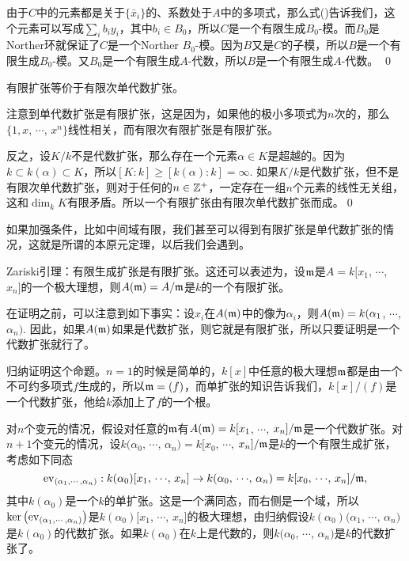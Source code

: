 	由于$C$中的元素都是关于$\{\bar{x}_i\}$的、系数处于$A$中的多项式，那么式(\theequation)告诉我们，这个元素可以写成$\sum_i b_i y_i$，其中$b_i\in B_0$，所以$C$是一个有限生成$B_0$-模。而$B_0$是Norther环就保证了$C$是一个Norther $B_0$-模。因为$B$又是$C$的子模，所以$B$是一个有限生成$B_0$-模。又$B_0$是一个有限生成$A$-代数，所以$B$是一个有限生成$A$-代数。
\qed

\pro 有限扩张等价于有限次单代数扩张。

\proof 注意到单代数扩张是有限扩张，这是因为，如果他的极小多项式为$n$次的，那么$\{1,x$, $\cdots$, $x^n\}$线性相关，而有限次有限扩张是有限扩张。

反之，设$K/k$不是代数扩张，那么存在一个元素$\alpha\in K$是超越的。因为$k\subset k(\alpha)\subset K$，所以$[K:k]\geq [k(\alpha):k]=\infty$. 如果$K/k$是代数扩张，但不是有限次单代数扩张，则对于任何的$n\in \mathbb{Z}^+$，一定存在一组$n$个元素的线性无关组，这和$\dim_k K$有限矛盾。所以一个有限扩张由有限次单代数扩张而成。\qed

如果加强条件，比如中间域有限，我们甚至可以得到有限扩张是单代数扩张的情况，这就是所谓的本原元定理，以后我们会遇到。

\lem Zariski引理：有限生成扩张是有限扩张。这还可以表述为，设$\mathfrak{m}$是$A=k[x_1$, $\cdots$, $x_n]$的一个极大理想，则$A(\mathfrak{m})=A/\mathfrak{m}$是$k$的一个有限扩张。

在证明之前，可以注意到如下事实：设$x_i$在$A(\mathfrak{m})$中的像为$\alpha_i$，则$A(\mathfrak{m})=k(\alpha_1$, $\cdots$, $\alpha_n)$. 因此，如果$A(\mathfrak{m})$如果是代数扩张，则它就是有限扩张，所以只要证明是一个代数扩张就行了。

\proof 
	归纳证明这个命题。$n=1$的时候是简单的，$k[x]$中任意的极大理想$\mathfrak{m}$都是由一个不可约多项式$f$生成的，所以$\mathfrak{m}=(f)$，而单扩张的知识告诉我们，$k[x]/(f)$是一个代数扩张，他给$k$添加上了$f$的一个根。

	对$n$个变元的情况，假设对任意的$\mathfrak{m}$有$A(\mathfrak{m})=k[x_1$, $\cdots$, $x_n]/\mathfrak{m}$是一个代数扩张。对$n+1$个变元的情况，设$k(\alpha_0$, $\cdots$, $\alpha_{n})=k[x_0$, $\cdots$, $x_n]/\mathfrak{m}$是$k$的一个有限生成扩张，考虑如下同态
	\[
		\operatorname{ev}_{(\alpha_1,\cdots,\alpha_n)}:k(\alpha_0)[x_1,\,\cdots\!,\,x_{n}]\to k(\alpha_0,\,\cdots\!,\,\alpha_{n})=k[x_0,\,\cdots\!,\,x_n]/\mathfrak{m},
	\]
	其中$k(\alpha_0)$是一个$k$的单扩张。这是一个满同态，而右侧是一个域，所以$\ker\left(\operatorname{ev}_{(\alpha_1,\cdots,\alpha_n)}\right)$是$k(\alpha_0)[x_1$, $\cdots$, $x_{n}]$的极大理想，由归纳假设$k(\alpha_0)(\alpha_1$, $\cdots$, $\alpha_{n})$是$k(\alpha_0)$的代数扩张。如果$k(\alpha_0)$在$k$上是代数的，则$k(\alpha_0$, $\cdots$, $\alpha_{n})$是$k$的代数扩张了。

